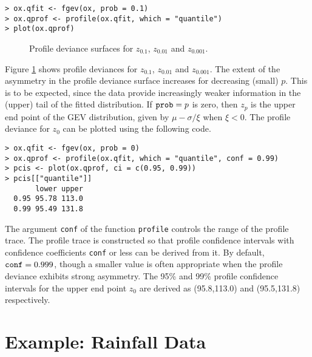 \documentclass[11pt,a4paper]{article}
\begin{document}
\begin{verbatim}
> ox.qfit <- fgev(ox, prob = 0.1)
> ox.qprof <- profile(ox.qfit, which = "quantile")
> plot(ox.qprof)
\end{verbatim}

\begin{figure}
\begin{center}
\vspace{-1.5cm}
\hspace{0cm}
\hspace{0cm}
\end{center} 
\caption{Profile deviance surfaces for $z_{0.1}$, $z_{0.01}$ and $z_{0.001}$.}
\label{quantprof}
\end{figure}

Figure \ref{quantprof} shows profile deviances for $z_{0.1}$, $z_{0.01}$ and $z_{0.001}$. 
The extent of the asymmetry in the profile deviance surface increases for decreasing (small) $p$.
This is to be expected, since the data provide increasingly weaker information in the (upper) tail of the fitted distribution.
If $\verb+prob+ = p$ is zero, then $z_p$ is the upper end point of the GEV distribution, given by $\mu-\sigma/\xi$ when $\xi < 0$.
The profile deviance for $z_0$ can be plotted using the following code.

\begin{verbatim}
> ox.qfit <- fgev(ox, prob = 0)
> ox.qprof <- profile(ox.qfit, which = "quantile", conf = 0.99)
> pcis <- plot(ox.qprof, ci = c(0.95, 0.99))
> pcis[["quantile"]]
       lower upper
  0.95 95.78 113.0
  0.99 95.49 131.8
\end{verbatim}

The argument \verb+conf+ of the function \verb+profile+ controls the range of the profile trace. 
The profile trace is constructed so that profile confidence intervals with confidence coefficients \verb+conf+ or less can be derived from it.
By default, $\verb+conf+ = 0.999$, though a smaller value is often appropriate when the profile deviance exhibits strong asymmetry. 
The 95\% and 99\% profile confidence intervals for the upper end point $z_0$ are derived as (95.8,113.0) and (95.5,131.8) respectively. 


\section{Example: Rainfall Data}
\setcounter{footnote}{0}
\label{egrain}
\end{document}

